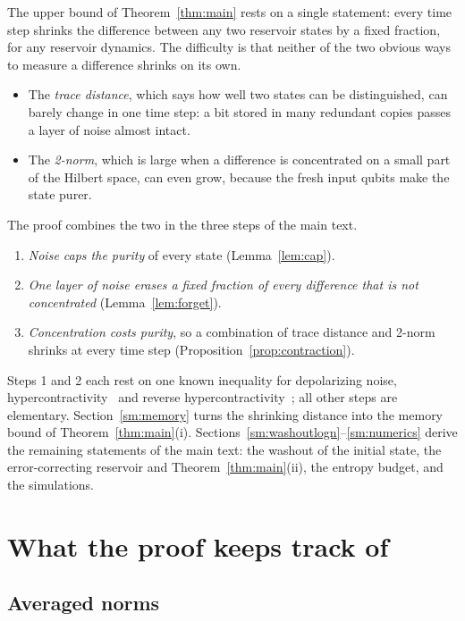 \documentclass[aps,prl,twocolumn,superscriptaddress,floatfix]{revtex4-2}
\theoremstyle{plain}
\begin{document}
The upper bound of Theorem~\ref{thm:main} rests on a single statement: every time step shrinks the difference between any two reservoir states by a fixed fraction, for any reservoir dynamics. The difficulty is that neither of the two obvious ways to measure a difference shrinks on its own.
\begin{itemize}
\item The \emph{trace distance}, which says how well two states can be distinguished, can barely change in one time step: a bit stored in many redundant copies passes a layer of noise almost intact.
\item The \emph{2-norm}, which is large when a difference is concentrated on a small part of the Hilbert space, can even grow, because the fresh input qubits make the state purer.
\end{itemize}
The proof combines the two in the three steps of the main text.
\begin{enumerate}
\item \emph{Noise caps the purity} of every state (Lemma~\ref{lem:cap}).
\item \emph{One layer of noise erases a fixed fraction of every difference that is not concentrated} (Lemma~\ref{lem:forget}).
\item \emph{Concentration costs purity}, so a combination of trace distance and 2-norm shrinks at every time step (Proposition~\ref{prop:contraction}).
\end{enumerate}
Steps 1 and 2 each rest on one known inequality for depolarizing noise, hypercontractivity~\cite{King2014} and reverse hypercontractivity~\cite{Cubitt2015}; all other steps are elementary. Section~\ref{sm:memory} turns the shrinking distance into the memory bound of Theorem~\ref{thm:main}(i). Sections~\ref{sm:washoutlogn}--\ref{sm:numerics} derive the remaining statements of the main text: the washout of the initial state, the error-correcting reservoir and Theorem~\ref{thm:main}(ii), the entropy budget, and the simulations.

\section{What the proof keeps track of}
\label{sm:norms}

\subsection{Averaged norms}
\end{document}
